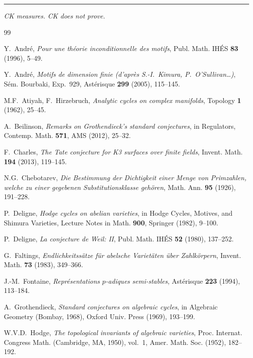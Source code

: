 \documentclass[11pt]{article}
\theoremstyle{definition}
\begin{document}
\bigskip
\hrule
\bigskip
\noindent\textit{CK measures.  CK does not prove.}


\begin{thebibliography}{99}

Y.~Andr\'e,
\textit{Pour une th\'eorie inconditionnelle des motifs},
Publ. Math. IH\'ES \textbf{83} (1996), 5--49.

Y.~Andr\'e,
\textit{Motifs de dimension finie (d'apr\`es S.-I.~Kimura, P.~O'Sullivan\ldots)},
S\'em. Bourbaki, Exp.~929, Ast\'erisque \textbf{299} (2005), 115--145.

M.F.~Atiyah, F.~Hirzebruch,
\textit{Analytic cycles on complex manifolds},
Topology \textbf{1} (1962), 25--45.

A.~Beilinson,
\textit{Remarks on Grothendieck's standard conjectures},
in Regulators, Contemp. Math. \textbf{571}, AMS (2012), 25--32.

F.~Charles,
\textit{The Tate conjecture for K3 surfaces over finite fields},
Invent. Math. \textbf{194} (2013), 119--145.

N.G.~Chebotarev,
\textit{Die Bestimmung der Dichtigkeit einer Menge von Primzahlen,
welche zu einer gegebenen Substitutionsklasse geh\"oren},
Math. Ann. \textbf{95} (1926), 191--228.

P.~Deligne,
\textit{Hodge cycles on abelian varieties},
in Hodge Cycles, Motives, and Shimura Varieties,
Lecture Notes in Math. \textbf{900}, Springer (1982), 9--100.

P.~Deligne,
\textit{La conjecture de Weil: II},
Publ. Math. IH\'ES \textbf{52} (1980), 137--252.

G.~Faltings,
\textit{Endlichkeitss\"atze f\"ur abelsche Variet\"aten \"uber
Zahlk\"orpern},
Invent. Math. \textbf{73} (1983), 349--366.

J.-M.~Fontaine,
\textit{Repr\'esentations $p$-adiques semi-stables},
Ast\'erisque \textbf{223} (1994), 113--184.

A.~Grothendieck,
\textit{Standard conjectures on algebraic cycles},
in Algebraic Geometry (Bombay, 1968), Oxford Univ. Press (1969), 193--199.

W.V.D.~Hodge,
\textit{The topological invariants of algebraic varieties},
Proc. Internat. Congress Math. (Cambridge, MA, 1950), vol.~1,
Amer. Math. Soc. (1952), 182--192.


\end{thebibliography}
\end{document}
